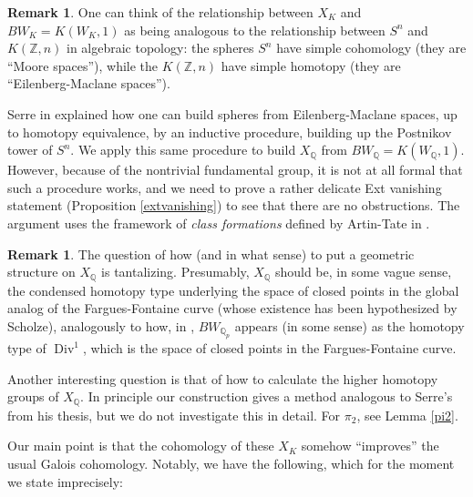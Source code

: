 \documentclass[12pt]{article}
\theoremstyle{definition}
\newtheorem{remark}[theorem]{Remark}
\newcommand{\on}{\operatorname}
\newcommand{\mbb}{\mathbb}
\begin{document}
\begin{remark}
One can think of the relationship between $X_K$ and $BW_K = K(W_K,1)$ as being analogous to the relationship between $S^n$ and $K(\mbb{Z},n)$ in algebraic topology: the spheres $S^n$ have simple cohomology (they are ``Moore spaces''), while the $K(\mbb{Z},n)$ have simple homotopy (they are ``Eilenberg-Maclane spaces'').

Serre in \cite{serrethesis} explained how one can build spheres from Eilenberg-Maclane spaces, up to homotopy equivalence, by an inductive procedure, building up the Postnikov tower of $S^n$.  We apply this same procedure to build $X_{\mbb{Q}}$ from $BW_\mbb{Q}=K(W_\mbb{Q},1)$.  However, because of the nontrivial fundamental group, it is not at all formal that such a procedure works, and we need to prove a rather delicate Ext vanishing statement (Proposition \ref{extvanishing}) to see that there are no obstructions.  The argument uses the framework of \emph{class formations} defined by Artin-Tate in \cite{artintate}.
\end{remark}

\begin{remark}
The question of how (and in what sense) to put a geometric structure on $X_{\mbb{Q}}$ is tantalizing.  Presumably, $X_{\mbb{Q}}$ should be, in some vague sense, the condensed homotopy type underlying the space of closed points in the global analog of the Fargues-Fontaine curve (whose existence has been hypothesized by Scholze), analogously to how, in \cite{farguesscholze}, $BW_{\mbb{Q}_p}$ appears (in some sense) as the homotopy type of $\on{Div}^1$, which is the space of closed points in the Fargues-Fontaine curve.

Another interesting question is that of how to calculate the higher homotopy groups of $X_\mbb{Q}$.  In principle our construction gives a method analogous to Serre's from his thesis, but we do not investigate this in detail.  For $\pi_2$, see Lemma \ref{pi2}.
\end{remark}

Our main point is that the cohomology of these $X_K$ somehow ``improves'' the usual Galois cohomology.  Notably, we have the following, which for the moment we state imprecisely:
\end{document}
